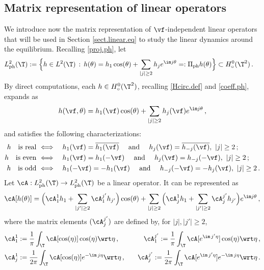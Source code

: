 \documentclass[a4paper,reqno,10pt]{article}
\begin{document}
\subsection{Matrix representation of linear operators}
We introduce now the matrix representation of $\vf$-independent linear operators that will be used in Section \ref{sect.linear.eq} to study the linear dynamics around the equilibrium. Recalling \eqref{proj.ph}, let
\begin{align}
	L_{\rm ph}^2(\T) & := \Big\{ h \in L^2(\T) \, : \, h(\theta) = h_{1}\cos(\theta)+ \sum_{|j|\geq 2} h_{j} e^{\im j\theta} =: \Pi_{\rm ph}h(\theta) \Big\} \subset H_{\circ}^0(\T^2) \,.
\end{align}
By direct computations, each $h\in H_\circ^0(\T^2)$, recalling \eqref{Hcirc.def} and \eqref{coeff.ph}, 
 expands as
 \begin{equation}
     h(\vf,\theta) = h_{1}(\vf)\cos(\theta) + \sum_{|j|\geq 2} h_{j}(\vf) e^{\im j\theta}\,,
 \end{equation}
and satisfies the following characterizations:
\begin{align}
    h \quad \hbox{is real} \  & \Longleftrightarrow \quad h_{1}(\vf) = \overline{h_{1}(\vf)} \ \quad \hbox{and}\quad  \ h_{j}(\vf) = \overline{h_{-j}(\vf)} , \ |j|\geq 2 \,; \label{real.h}\\
    h\quad \hbox{is even} \  & \Longleftrightarrow \quad h_{1}(\vf) = h_{1}(-\vf) \ \quad \hbox{and}\quad \ h_{j}(\vf) = h_{-j}(-\vf), \ |j|\geq 2  \,; \label{even.h} \\
     h\quad \hbox{is odd} \ & \Longleftrightarrow \quad h_{1}(-\vf) = - h_{1}(\vf) \ \quad \hbox{and}\quad \ h_{-j}(-\vf) = -h_{j}(\vf), \ |j|\geq 2  \,. \label{odd.h}
\end{align}
Let $\cA: L_{\rm ph}^2(\T)\to L_{\rm ph}^2(\T)$ be a linear operator. It can be represented as
\begin{equation}\label{matrix.repr.ph}
	\cA [h(\theta)] = \Big( \cA_{1}^{1} h_{1}+ \sum_{|j'|\geq 2} \cA_{1}^{j'} h_{j'}  \Big)\cos(\theta) + \sum_{|j|\geq 2}\Big( \cA_{j}^{1} h_{1} +\sum_{|j'|\geq 2} \cA_{j}^{j'} h_{j'} \Big)e^{\im j\theta} \,,
\end{equation}
where the matrix elements $(\cA_{j}^{j'})$ are defined by, for $|j|, |j'|\geq 2$,
\begin{equation}
	\begin{aligned}
		\cA_{1}^{1}&:= \frac{1}{\pi} \int_{\T} \cA[\cos(\eta)] \cos(\eta) \wrt\eta \,, \quad	&	\cA_{1}^{j'}  := \frac{1}{\pi} \int_{\T}\cA[e^{\im\,j'\eta}] \cos(\eta) \wrt\eta \,, \\
		\cA_{j}^{1} & := \frac{1}{2\pi} \int_{\T} \cA[\cos(\eta)] e^{-\im\,j\eta} \wrt\eta \,, \quad&	\cA_{j}^{j'}  := \frac{1}{2\pi} \int_{\T} \cA[e^{\im\,j'\eta}] e^{-\im\,j\eta} \wrt\eta \,.
	\end{aligned}
\end{equation}
\end{document}
